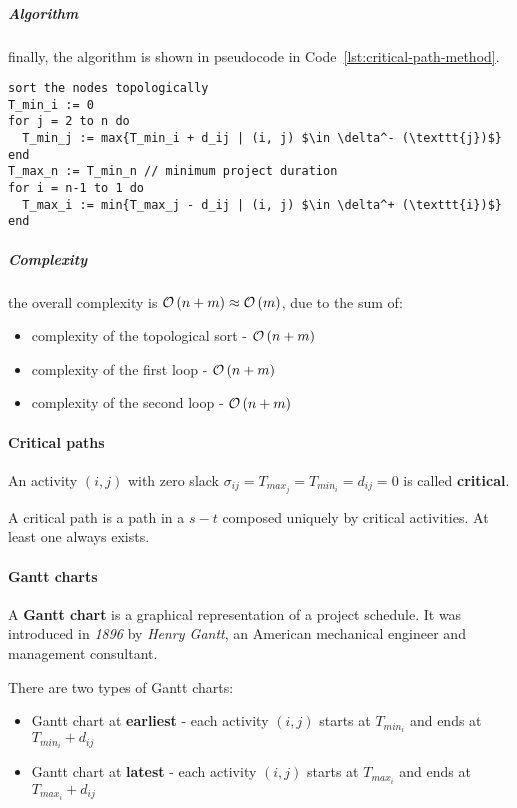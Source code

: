 \documentclass[english]{article}
\begin{document}
\subparagraph*{Algorithm}
finally, the algorithm is shown in pseudocode in Code~\ref{lst:critical-path-method}.

\begin{lstlisting}[caption={Critical path method}, label={lst:critical-path-method}, float]
sort the nodes topologically
T_min_i := 0
for j = 2 to n do
  T_min_j := max{T_min_i + d_ij | (i, j) $\in \delta^- (\texttt{j})$}
end
T_max_n := T_min_n // minimum project duration
for i = n-1 to 1 do
  T_max_i := min{T_max_j - d_ij | (i, j) $\in \delta^+ (\texttt{i})$}
end
\end{lstlisting}

\subparagraph*{Complexity}
the overall complexity is \(\mathcal{O}\left(n+m\right) \approx \mathcal{O}\left(m\right)\), due to the sum of:

\begin{itemize}
  \item complexity of the topological sort - \(\mathcal{O}\left(n+m\right)\)
  \item complexity of the first loop - \(\mathcal{O}\left(n+m\right)\)
  \item complexity of the second loop - \(\mathcal{O}\left(n+m\right)\)
\end{itemize}

\paragraph{Critical paths}

An activity \(\left( i, j \right)\) with zero slack \(\sigma_{ij} = T_{max_j} = T_{min_i} = d_{ij} = 0\) is called \textbf{critical}.

A critical path is a path in a \(s-t\) composed uniquely by critical activities.
At least one always exists.

\paragraph{Gantt charts}

A \textbf{Gantt chart} is a graphical representation of a project schedule.
It was introduced in \textit{1896} by \textit{Henry Gantt}, an American mechanical engineer and management consultant.

There are two types of Gantt charts:

\begin{itemize}
  \item Gantt chart at \textbf{earliest} - each activity \(\left( i, j \right)\) starts at \(T_{min_i}\) and ends at \(T_{min_i} + d_{ij}\)
  \item Gantt chart at \textbf{latest} - each activity \(\left( i, j \right)\) starts at \(T_{max_i}\) and ends at \(T_{max_i} + d_{ij}\)
\end{itemize}
\end{document}
